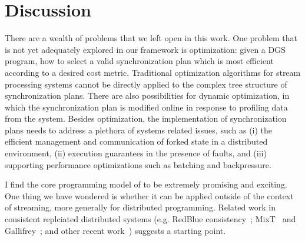 \section{Discussion}
\label{dgs:sec:conclusion}

There are a wealth of problems that we left open in this work.
One problem that is not yet adequately explored in our framework is optimization:
given a DGS program, how to select a valid synchronization plan which is most efficient according to a desired cost metric.
Traditional optimization algorithms for stream processing systems cannot be directly applied to
the complex tree structure of synchronization plans.
There are also possibilities for
dynamic optimization, in which the synchronization plan is modified online in response to profiling data from the system.
Besides optimization, the implementation of synchronization plans needs to address a plethora of systems related issues, such as (i) the efficient management and communication of forked state in a distributed environment, (ii) execution guarantees in the presence of faults, and (iii) supporting performance optimizations such as batching and backpressure.

I find the core programming model of  to be extremely promising and exciting. One thing we have wondered is whether it can be applied outside of the context of streaming, more generally for distributed programming. Related work in consistent replciated distributed systems (e.g. RedBlue consistency~\cite{li2012making}; MixT~\cite{milano2018mixt} and Gallifrey~\cite{milanogallifrey}; and other recent work~\cite{PLDI22MRDTs}) suggests a starting point.
